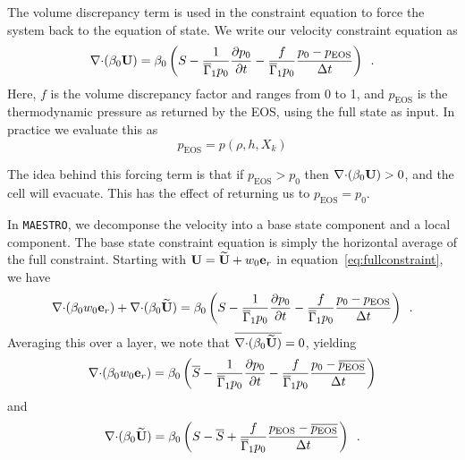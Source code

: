 The volume discrepancy term is used in the constraint equation to
force the system back to the equation of state.  We write our velocity
constraint equation as
\begin{equation}
\mathbf{\nabla} \mathbf{\cdot} (\beta_0 {\bf U})  = \beta_0 \left(S - \frac{1}{\overline{\Gamma}_1 p_0} \frac{\partial p_0}{\partial t} - \frac{f}{\overline{\Gamma}_1 p_0} \frac{p_0 - p_\mathrm{EOS}}{\Delta t} \right ) \enskip .
\label{eq:fullconstraint}
\end{equation}
Here, $f$ is the volume discrepancy factor and ranges from 0 to 1, and
$p_\mathrm{EOS}$ is the thermodynamic pressure as returned by the EOS,
using the full state as input.
In practice we evaluate this as
\begin{equation}
p_\mathrm{EOS} = p(\rho,h,X_k)
\end{equation}

The idea behind this forcing term is that if $p_\mathrm{EOS} > p_0$ then
$\mathbf{\nabla} \mathbf{\cdot} (\beta_0 {\bf U}) > 0$, and the cell will evacuate.  This
has the effect of returning us to $p_\mathrm{EOS} = p_0$.

In {\tt MAESTRO}, we decomponse the velocity into a base state component
and a local component.  The base state constraint equation is simply
the horizontal average of the full constraint.  Starting with 
${\bf U} = \widetilde{{\bf U}} + w_0 \mathbf{e}_r$ in equation~\ref{eq:fullconstraint}, we have
\begin{equation}
\mathbf{\nabla} \mathbf{\cdot} (\beta_0 w_0 \mathbf{e}_r) + \mathbf{\nabla} \mathbf{\cdot} (\beta_0 \widetilde{{\bf U}})  = \beta_0 \left(S - \frac{1}{\overline{\Gamma}_1 p_0} \frac{\partial p_0}{\partial t} - \frac{f}{\overline{\Gamma}_1 p_0} \frac{p_0 - p_\mathrm{EOS}}{\Delta t} \right ) \enskip .
\label{eq:fullconstraint2}
\end{equation}
Averaging this over a layer, we note that $\overline{\mathbf{\nabla} \mathbf{\cdot} (\beta_0 \widetilde{{\bf U}})} = 0$,
yielding
\begin{equation}
\mathbf{\nabla} \mathbf{\cdot} (\beta_0 w_0 \mathbf{e}_r)  = \beta_0 \left(\overline{S} - \frac{1}{\overline{\Gamma}_1 p_0} \frac{\partial p_0}{\partial t} - \frac{f}{\overline{\Gamma}_1 p_0} \frac{p_0 - \overline{p_\mathrm{EOS}}}{\Delta t} \right ) 
\label{eq:w0constraint_vd}
\end{equation}
and
\begin{equation}
\mathbf{\nabla} \mathbf{\cdot} (\beta_0 \widetilde{{\bf U}})  = \beta_0 \left(S - \overline{S} + \frac{f}{\overline{\Gamma}_1 p_0} \frac{p_\mathrm{EOS} - \overline{p_\mathrm{EOS}}}{\Delta t} \right ) \enskip .
\label{eq:Utconstraint_vd}
\end{equation}

